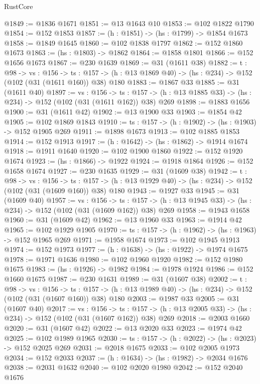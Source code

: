 \begin{lexlean}{RustCore}
\begin{coremodule}
@1849 := @1836 @1671
@1851 := @13 @1643 @10
@1853 := @102 @1822 @1790
@1854 := @152 @1853
@1857 := (h : @1851) -> (hs : @1799) -> @1854 @1673
@1858 := @1849 @1645
@1860 := @102 @1838 @1797
@1862 := @152 @1860 @1673
@1863 := (hs : @1803) -> @1862
@1864 := @1858 @1801
@1866 := @152 @1656 @1673
@1867 := @230 @1639
@1869 := @31 (@1611 @38)
@1882 := {t : @98} ->
  {vs : @156} ->
  {ts : @157} -> (h : @13 @1869 @40) -> (hs : @234) -> @152 (@102 (@31 (@1611 @160)) @38) @180
@1883 := @1867 @33
@1885 := @31 (@1611 @40)
@1897 := {vs : @156} ->
  {ts : @157} -> (h : @13 @1885 @33) -> (hs : @234) -> @152 (@102 (@31 (@1611 @162)) @38) @269
@1898 := @1883 @1656
@1900 := @31 (@1611 @42)
@1902 := @13 @1900 @33
@1903 := @1854 @42
@1905 := @102 @1869 @1843
@1910 := {ts : @157} -> (h : @1902) -> (hs : @1903) -> @152 @1905 @269
@1911 := @1898 @1673
@1913 := @102 @1885 @1853
@1914 := @152 @1913
@1917 := (h : @1642) -> (hs : @1862) -> @1914 @1674
@1918 := @1911 @1640
@1920 := @102 @1900 @1860
@1922 := @152 @1920 @1674
@1923 := (hs : @1866) -> @1922
@1924 := @1918 @1864
@1926 := @152 @1658 @1674
@1927 := @230 @1635
@1929 := @31 (@1609 @38)
@1942 := {t : @98} ->
  {vs : @156} ->
  {ts : @157} -> (h : @13 @1929 @40) -> (hs : @234) -> @152 (@102 (@31 (@1609 @160)) @38) @180
@1943 := @1927 @33
@1945 := @31 (@1609 @40)
@1957 := {vs : @156} ->
  {ts : @157} -> (h : @13 @1945 @33) -> (hs : @234) -> @152 (@102 (@31 (@1609 @162)) @38) @269
@1958 := @1943 @1658
@1960 := @31 (@1609 @42)
@1962 := @13 @1960 @33
@1963 := @1914 @42
@1965 := @102 @1929 @1905
@1970 := {ts : @157} -> (h : @1962) -> (hs : @1963) -> @152 @1965 @269
@1971 := @1958 @1674
@1973 := @102 @1945 @1913
@1974 := @152 @1973
@1977 := (h : @1638) -> (hs : @1922) -> @1974 @1675
@1978 := @1971 @1636
@1980 := @102 @1960 @1920
@1982 := @152 @1980 @1675
@1983 := (hs : @1926) -> @1982
@1984 := @1978 @1924
@1986 := @152 @1660 @1675
@1987 := @230 @1631
@1989 := @31 (@1607 @38)
@2002 := {t : @98} ->
  {vs : @156} ->
  {ts : @157} -> (h : @13 @1989 @40) -> (hs : @234) -> @152 (@102 (@31 (@1607 @160)) @38) @180
@2003 := @1987 @33
@2005 := @31 (@1607 @40)
@2017 := {vs : @156} ->
  {ts : @157} -> (h : @13 @2005 @33) -> (hs : @234) -> @152 (@102 (@31 (@1607 @162)) @38) @269
@2018 := @2003 @1660
@2020 := @31 (@1607 @42)
@2022 := @13 @2020 @33
@2023 := @1974 @42
@2025 := @102 @1989 @1965
@2030 := {ts : @157} -> (h : @2022) -> (hs : @2023) -> @152 @2025 @269
@2031 := @2018 @1675
@2033 := @102 @2005 @1973
@2034 := @152 @2033
@2037 := (h : @1634) -> (hs : @1982) -> @2034 @1676
@2038 := @2031 @1632
@2040 := @102 @2020 @1980
@2042 := @152 @2040 @1676

\end{coremodule}
\end{lexlean}
